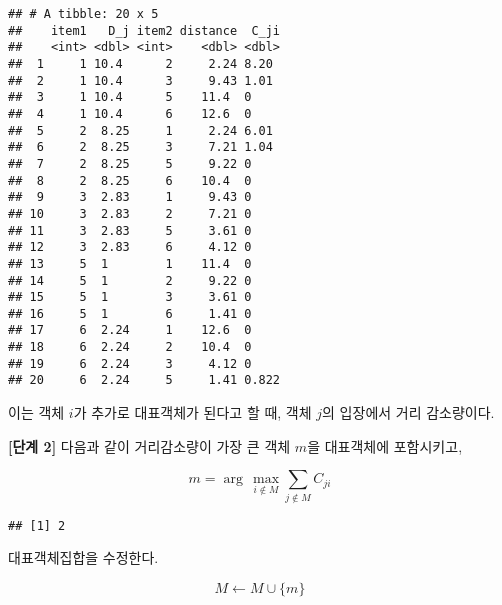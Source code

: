 \documentclass[
]{book}
\newenvironment{Shaded}{\begin{snugshade}}{\end{snugshade}}
\newcommand{\AttributeTok}[1]{\textcolor[rgb]{0.77,0.63,0.00}{#1}}
\newcommand{\DecValTok}[1]{\textcolor[rgb]{0.00,0.00,0.81}{#1}}
\newcommand{\FunctionTok}[1]{\textcolor[rgb]{0.00,0.00,0.00}{#1}}
\newcommand{\NormalTok}[1]{#1}
\newcommand{\OtherTok}[1]{\textcolor[rgb]{0.56,0.35,0.01}{#1}}
\newcommand{\SpecialCharTok}[1]{\textcolor[rgb]{0.00,0.00,0.00}{#1}}
\begin{document}
\begin{verbatim}
## # A tibble: 20 x 5
##    item1   D_j item2 distance  C_ji
##    <int> <dbl> <int>    <dbl> <dbl>
##  1     1 10.4      2     2.24 8.20 
##  2     1 10.4      3     9.43 1.01 
##  3     1 10.4      5    11.4  0    
##  4     1 10.4      6    12.6  0    
##  5     2  8.25     1     2.24 6.01 
##  6     2  8.25     3     7.21 1.04 
##  7     2  8.25     5     9.22 0    
##  8     2  8.25     6    10.4  0    
##  9     3  2.83     1     9.43 0    
## 10     3  2.83     2     7.21 0    
## 11     3  2.83     5     3.61 0    
## 12     3  2.83     6     4.12 0    
## 13     5  1        1    11.4  0    
## 14     5  1        2     9.22 0    
## 15     5  1        3     3.61 0    
## 16     5  1        6     1.41 0    
## 17     6  2.24     1    12.6  0    
## 18     6  2.24     2    10.4  0    
## 19     6  2.24     3     4.12 0    
## 20     6  2.24     5     1.41 0.822
\end{verbatim}

이는 객체 \(i\)가 추가로 대표객체가 된다고 할 때, 객체 \(j\)의 입장에서 거리 감소량이다.

\textbf{{[}단계 2{]}} 다음과 같이 거리감소량이 가장 큰 객체 \(m\)을 대표객체에 포함시키고,

\begin{equation*}
m = \arg\,\max_{i \notin M} \sum_{j \notin M} C_{ji}
\end{equation*}

\begin{Shaded}
\end{Shaded}

\begin{verbatim}
## [1] 2
\end{verbatim}

대표객체집합을 수정한다.

\begin{equation*}
M \leftarrow M \cup \{m\}
\end{equation*}
\end{document}
